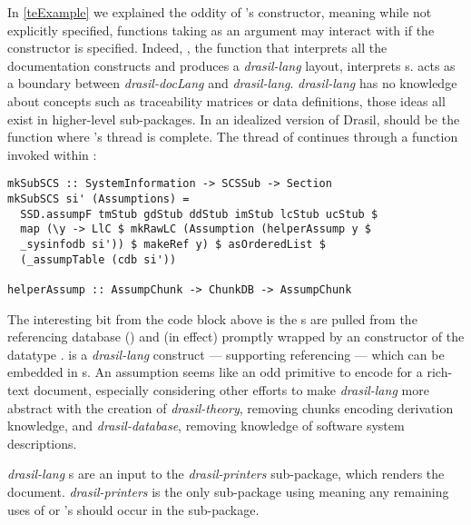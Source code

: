 In \autoref{teExample} we explained the oddity of 's  constructor, meaning while not explicitly specified, functions taking  as an argument may interact with  if the  constructor is specified. Indeed, , the function that interprets all the documentation constructs and produces a \textit{drasil-lang}  layout, interprets s.  acts as a boundary between \textit{drasil-docLang} and \textit{drasil-lang}. \textit{drasil-lang} has no knowledge about concepts such as traceability matrices or data definitions, those ideas all exist in higher-level sub-packages. In an idealized version of Drasil,  should be the function where 's thread is complete. The thread of  continues through a function invoked within :

\begin{tcolorbox}
\begin{verbatim}
mkSubSCS :: SystemInformation -> SCSSub -> Section
mkSubSCS si' (Assumptions) =
  SSD.assumpF tmStub gdStub ddStub imStub lcStub ucStub $
  map (\y -> LlC $ mkRawLC (Assumption (helperAssump y $
  _sysinfodb si')) $ makeRef y) $ asOrderedList $
  (_assumpTable (cdb si'))

helperAssump :: AssumpChunk -> ChunkDB -> AssumpChunk
\end{verbatim}
\end{tcolorbox}

The interesting bit from the code block above is the s are pulled from the referencing database () and (in effect) promptly wrapped by an  constructor of the datatype .  is a \textit{drasil-lang} construct --- supporting referencing --- which can be embedded in s. An assumption seems like an odd primitive to encode for a rich-text document, especially considering other efforts to make \textit{drasil-lang} more abstract with the creation of \textit{drasil-theory}, removing chunks encoding derivation knowledge, and \textit{drasil-database}, removing knowledge of software system descriptions.

\textit{drasil-lang} s are an input to the \textit{drasil-printers} sub-package, which renders the document. \textit{drasil-printers} is the only sub-package using  meaning any remaining uses of  or 's \linebreak{} should occur in the sub-package.


